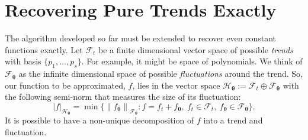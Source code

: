 \documentclass[]{mcom-l}
\theoremstyle{plain}
\theoremstyle{definition}
\newcommand{\btheta}{{\boldsymbol{\theta}}}
\newcommand{\calf}{{\mathcal{F}}}
\newcommand{\calh}{{\mathcal{H}}}
\def\abs#1{\ensuremath{\left \lvert #1 \right \rvert}}
\newcommand{\norm}[2][{}]{\ensuremath{\left \lVert #2 \right \rVert}_{#1}}
\begin{document}
\section{Recovering Pure Trends Exactly} \label{sec:poly}

The algorithm developed so far must be extended to recover even constant functions exactly.  Let $\calf_t$ be a finite dimensional vector space of possible \emph{trends} with basis $\{p_1, \ldots, p_s\}$.  For example, it might be space of polynomials.  We think of $\calf_{\btheta}$ as the infinite dimensional space of possible \emph{fluctuations} around the trend.  So, our function to be approximated, $f$, lies in the vector space $\calh_\btheta := \calf_t \oplus \calf_\btheta$ with the following semi-norm that measures the size of its fluctuation:
\begin{equation} \label{eq:seminorm} 
\abs{f}_{\calh_\btheta} = \min \{ \norm[\calf_\btheta] {f_\btheta} : f = f_t + f_\btheta, \ f_t \in \calf_t, \ f_\btheta \in \calf_\btheta \}.
\end{equation}
It is possible to have a non-unique decomposition of $f$ into a trend and fluctuation.
\end{document}
